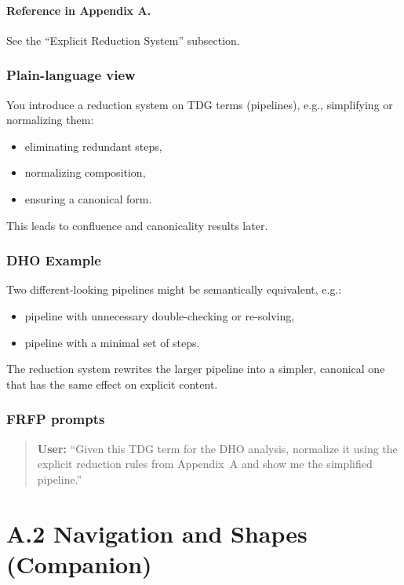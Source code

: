 \paragraph{Reference in Appendix A.}
See the ``Explicit Reduction System'' subsection.

\subsubsection*{Plain-language view}

You introduce a reduction system on TDG terms (pipelines), e.g., simplifying or normalizing them:

\begin{itemize}
 \item eliminating redundant steps,
 \item normalizing composition,
 \item ensuring a canonical form.
\end{itemize}

This leads to confluence and canonicality results later.

\subsubsection*{DHO Example}

Two different-looking pipelines might be semantically equivalent, e.g.:

\begin{itemize}
 \item pipeline with unnecessary double-checking or re-solving,
 \item pipeline with a minimal set of steps.
\end{itemize}

The reduction system rewrites the larger pipeline into a simpler, canonical one that has the same
effect on explicit content.

\subsubsection*{FRFP prompts}

\begin{quote}
\textbf{User:} 
``Given this TDG term for the DHO analysis, normalize it using the explicit reduction rules from Appendix~A and show me the simplified pipeline.'' 
\end{quote}

\newpage

\section{A.2 Navigation and Shapes (Companion)}

